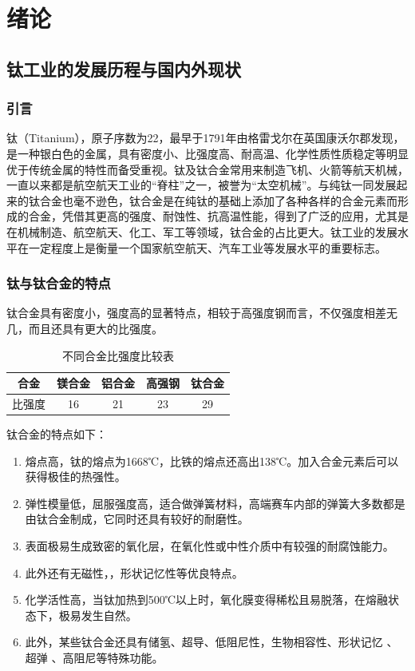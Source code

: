 	\chapter{绪论}
\section{钛工业的发展历程与国内外现状}
\subsection{引言}

钛（Titanium），原子序数为22，最早于1791年由格雷戈尔在英国康沃尔郡发现，是一种银白色的金属，具有密度小、比强度高、耐高温、化学性质性质稳定等明显优于传统金属的特性而备受重视。钛及钛合金常用来制造飞机、火箭等航天机械，一直以来都是航空航天工业的“脊柱”之一，被誉为“太空机械”\cite{XJYS200102014}。与纯钛一同发展起来的钛合金也毫不逊色，钛合金是在纯钛的基础上添加了各种各样的合金元素而形成的合金，凭借其更高的强度、耐蚀性、抗高温性能，得到了广泛的应用，尤其是在机械制造、航空航天、化工、军工等领域，钛合金的占比更大。钛工业的发展水平在一定程度上是衡量一个国家航空航天、汽车工业等发展水平的重要标志\cite{HSJJ202109005}。

\subsection{钛与钛合金的特点}
钛合金具有密度小，强度高的显著特点，相较于高强度钢而言，不仅强度相差无几，而且还具有更大的比强度。

\begin{table}[htbp]
	\centering
	\label{sec:bqd}
	\caption{不同合金比强度比较表}
	\begin{tabular}{ccccc}
		\hline
		\textbf{合金} & \textbf{镁合金} & \textbf{铝合金} & \textbf{高强钢} & \textbf{钛合金} \\
		\hline
		比强度 & 16 & 21 & 23 & 29 \\
		\hline
	\end{tabular}
\end{table}

钛合金的特点如下\cite{1997titanium}：
\begin{enumerate}
	\item 熔点高，钛的熔点为1668℃，比铁的熔点还高出138℃。加入合金元素后可以获得极佳的热强性。
	\item 弹性模量低，屈服强度高，适合做弹簧材料，高端赛车内部的弹簧大多数都是由钛合金制成，它同时还具有较好的耐磨性。
	\item 表面极易生成致密的氧化层，在氧化性或中性介质中有较强的耐腐蚀能力。
	\item 此外还有无磁性，，形状记忆性等优良特点。
	\item 化学活性高，当钛加热到500℃以上时，氧化膜变得稀松且易脱落，在熔融状态下，极易发生自然。
	\item 此外，某些钛合金还具有储氢、超导、低阻尼性，生物相容性、形状记忆 、 超弹 、高阻尼等特殊功能。
\end{enumerate}


